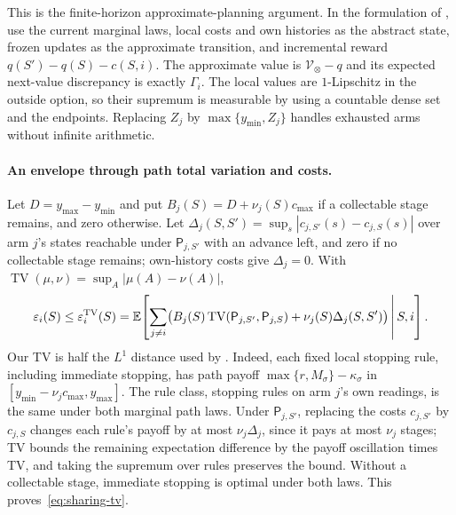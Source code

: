 This is the finite-horizon approximate-planning argument. In the formulation of
\citet[Theorem~9 and Remark~11]{subramanian2022ais}, use the current marginal
laws, local costs and own histories as the abstract state, frozen updates as the approximate
transition, and incremental reward $q(S')-q(S)-c(S,i)$. The approximate value
is $\mathcal V_\otimes-q$ and its expected next-value discrepancy is exactly
$\Gamma_i$. The local values are $1$-Lipschitz in the outside option,
so their supremum is measurable by using a countable dense set and the
endpoints. Replacing $Z_j$ by $\max\{y_{\min},Z_j\}$ handles exhausted arms
without infinite arithmetic.

\paragraph{An envelope through path total variation and costs.}
Let $D=y_{\max}-y_{\min}$ and put $B_j(S)=D+\nu_j(S)c_{\max}$ if a
collectable stage remains, and zero otherwise. Let $\Delta_j(S,S')=\sup_s|c_{j,S'}(s)-c_{j,S}(s)|$
over arm $j$'s states reachable under $\mathsf P_{j,S'}$ with an advance left, and zero if no
collectable stage remains; own-history costs give $\Delta_j=0$. With
$\operatorname{TV}(\mu,\nu)=\sup_A|\mu(A)-\nu(A)|$,
\begin{equation}
 \varepsilon_i(S)\le\varepsilon_i^{\rm TV}(S)
 =\mathbb{E}\!\left[\sum_{j\ne i}\bigl(B_j(S)
   \operatorname{TV}(\mathsf P_{j,S'},\mathsf P_{j,S})+\nu_j(S)\Delta_j(S,S')\bigr)\,\middle|\,S,i\right].
 \label{eq:sharing-tv}
\end{equation}
Our TV is half the $L^1$ distance used by \citet[Section~3.1]{subramanian2022ais}.
Indeed, each fixed local stopping rule, including immediate stopping, has path
payoff $\max\{r,M_\sigma\}-\kappa_\sigma$ in
$[y_{\min}-\nu_jc_{\max},y_{\max}]$. The rule class, stopping rules on arm $j$'s own
readings, is the same under both marginal path laws. Under $\mathsf P_{j,S'}$, replacing the
costs $c_{j,S'}$ by $c_{j,S}$ changes each rule's payoff by at most $\nu_j\Delta_j$, since it
pays at most $\nu_j$ stages; TV bounds the remaining expectation difference by the payoff
oscillation times TV, and taking the supremum over rules preserves the bound. Without a collectable stage, immediate stopping is
optimal under both laws. This proves~\eqref{eq:sharing-tv}.


